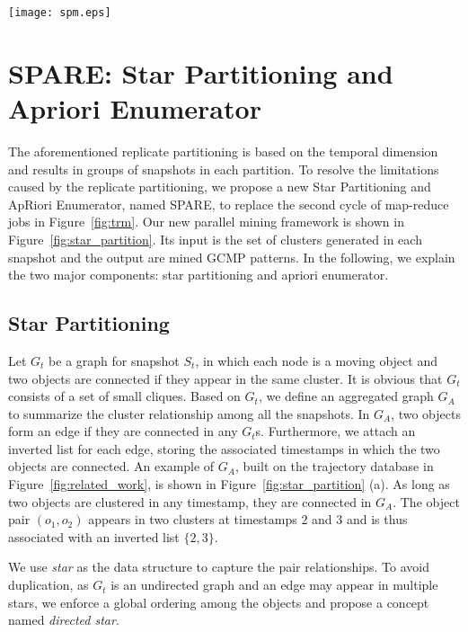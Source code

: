 
\begin{figure*}[t]
\centering
\texttt{[image: spm.eps]}
\caption{Star partition and mining. (a) Conceptual connection graph from Figure 1.(b) Five star partitions are generated
(c) Apriori Mining with various pruning techniques.}
\label{fig:star_partition}
\end{figure*}

\section{SPARE: Star Partitioning and Apriori Enumerator}
\label{sec:spm}
The aforementioned replicate partitioning is based on the temporal dimension 
and results in groups of snapshots in each partition. 
To resolve the limitations caused by the replicate partitioning, 
we propose a new Star Partitioning and ApRiori Enumerator, named SPARE, 
to replace the second cycle of map-reduce jobs in Figure~\ref{fig:trm}. 
Our new parallel mining framework is shown in Figure~\ref{fig:star_partition}. 
Its input is the set of clusters generated in each snapshot and the output 
are mined GCMP patterns. In the following, we explain the two major components: 
star partitioning and apriori enumerator.


\subsection{Star Partitioning}
Let $G_t$ be a graph for snapshot $S_t$, in which each node 
is a moving object and two objects are connected if they appear 
in the same cluster. It is obvious that $G_t$ consists of a set of small cliques. 
Based on $G_t$, we define an aggregated graph $G_A$ to summarize the 
cluster relationship among all the snapshots. In $G_A$, two objects
form an edge if they are connected in any $G_t$s. Furthermore, 
we attach an inverted list for each edge, 
storing the associated timestamps in which the two objects are connected. 
An example of $G_A$, built on the trajectory database in Figure~\ref{fig:related_work}, 
is shown in Figure~\ref{fig:star_partition} (a). 
As long as two objects are clustered in any timestamp, they are connected in $G_A$. 
The object pair $(o_1,o_2)$ appears in two clusters at timestamps 
$2$ and $3$ and is thus associated with an inverted list $\{2,3\}$.


We use \emph{star} as the data structure to capture the pair relationships. 
To avoid duplication, as $G_t$ is an undirected graph and an edge may appear in multiple stars, 
we enforce a global ordering among the objects and propose a concept named \textit{directed star}.

